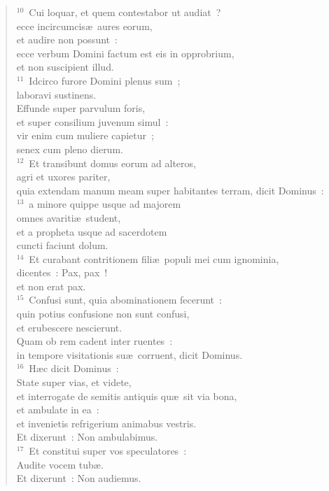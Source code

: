 \begin{flushleft}
\begin{verse}
${}^{10}$~Cui loquar, et quem contestabor ut audiat~?\\ ecce incircumcis\ae\ aures eorum,\\ et audire non possunt~:\\ ecce verbum Domini factum est eis in opprobrium,\\ et non suscipient illud.\\
${}^{11}$~Idcirco furore Domini plenus sum~;\\ laboravi sustinens.\\ Effunde super parvulum foris,\\ et super consilium juvenum simul~:\\ vir enim cum muliere capietur~;\\ senex cum pleno dierum.\\
${}^{12}$~Et transibunt domus eorum ad alteros,\\ agri et uxores pariter,\\ quia extendam manum meam super habitantes terram, dicit Dominus~:\\
${}^{13}$~a minore quippe usque ad majorem\\ omnes avariti\ae\ student,\\ et a propheta usque ad sacerdotem\\ cuncti faciunt dolum.\\
${}^{14}$~Et curabant contritionem fili\ae\ populi mei cum ignominia,\\ dicentes~: Pax, pax~!\\ et non erat pax.\\
${}^{15}$~Confusi sunt, quia abominationem fecerunt~:\\ quin potius confusione non sunt confusi,\\ et erubescere nescierunt.\\ Quam ob rem cadent inter ruentes~:\\ in tempore visitationis su\ae\ corruent, dicit Dominus.\\
${}^{16}$~H\ae c dicit Dominus~:\\ State super vias, et videte,\\ et interrogate de semitis antiquis qu\ae\ sit via bona,\\ et ambulate in ea~:\\ et invenietis refrigerium animabus vestris.\\ Et dixerunt~: Non ambulabimus.\\
${}^{17}$~Et constitui super vos speculatores~:\\ Audite vocem tub\ae .\\ Et dixerunt~: Non audiemus.\\

\end{verse}
\end{flushleft}
